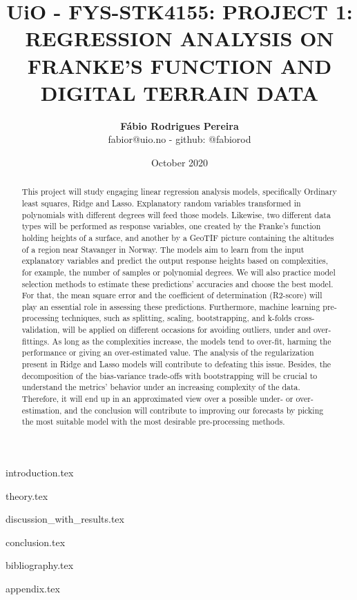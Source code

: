 \documentclass{article}
\title{UiO - FYS-STK4155: PROJECT 1: REGRESSION ANALYSIS ON FRANKE'S  FUNCTION AND DIGITAL TERRAIN DATA}
\author{\textbf{Fábio Rodrigues Pereira} \\ \small fabior@uio.no - github: @fabiorod}
\date{October 2020}
\begin{document}
\maketitle
\begin{abstract}
\noindent This project will study engaging linear regression analysis models, specifically Ordinary least squares, Ridge and Lasso. Explanatory random variables transformed in polynomials with different degrees will feed those models. Likewise, two different data types will be performed as response variables, one created by the Franke's function holding heights of a surface, and another by a GeoTIF picture containing the altitudes of a region near Stavanger in Norway. The models aim to learn from the input explanatory variables and predict the output response heights based on complexities, for example, the number of samples or polynomial degrees. We will also practice model selection methods to estimate these predictions' accuracies and choose the best model. For that, the mean square error and the coefficient of determination (R2-score) will play an essential role in assessing these predictions. Furthermore, machine learning pre-processing techniques, such as splitting, scaling, bootstrapping, and k-folds cross-validation, will be applied on different occasions for avoiding outliers, under and over-fittings. As long as the complexities increase, the models tend to over-fit, harming the performance or giving an over-estimated value. The analysis of the regularization present in Ridge and Lasso models will contribute to defeating this issue. Besides, the decomposition of the bias-variance trade-offs with bootstrapping will be crucial to understand the metrics' behavior under an increasing complexity of the data. Therefore, it will end up in an approximated view over a possible under- or over-estimation, and the conclusion will contribute to improving our forecasts by picking the most suitable model with the most desirable pre-processing methods.
\end{abstract}

\clearpage
\thispagestyle{empty}

\tableofcontents

\clearpage
\thispagestyle{empty}

{introduction.tex}

\clearpage
\thispagestyle{empty}

{theory.tex}

\clearpage
\thispagestyle{empty}

{discussion_with_results.tex}

\clearpage
\thispagestyle{empty}

{conclusion.tex}

\clearpage
\thispagestyle{empty}

{bibliography.tex}

\clearpage
\thispagestyle{empty}

{appendix.tex}
\end{document}
